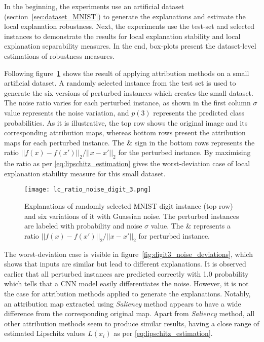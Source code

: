 \documentclass[english]{tktltiki2}
\theoremstyle{definition}
\theoremstyle{remark}
\begin{document}
In the beginning, the experiments use an artificial dataset (section~\ref{sec:dataset_MNIST}) to generate the explanations and estimate the local explanation robustness.  Next, the experiments use the test-set and selected instances to demonstrate the results for local explanation stability and local explanation separability measures. In the end, box-plots present the dataset-level estimations of robustness measures.

Following figure~\ref{fig:digit3_noise_ratio} shows the result of applying attribution methods on a small artificial dataset. A randomly selected instance from the test set is used to generate the six versions of perturbed instances which creates the small dataset. The noise ratio varies for each perturbed instance, as shown in the first column $\sigma$ value represents the noise variation, and $p(3)$ represents the predicted class probabilities. As it is illustrative, the top row shows the original image and its corresponding attribution maps, whereas bottom rows present the attribution maps for each perturbed instance. The \& sign in the bottom rows represents the ratio $||f(x) - f(x\prime)||_2/||x - x\prime||_2$ for the perturbed instance. By maximising the ratio as per \eqref{eq:lipschitz_estimation} gives the worst-deviation case of local explanation stability measure for this small dataset.

\begin{figure}[H]
	\vspace*{0mm}
	\centering
	\texttt{[image: lc\_ratio\_noise\_digit\_3.png]}
	\caption{Explanations of randomly selected MNIST digit instance (top row) and six variations of it with Guassian noise. The perturbed instances are labeled with probability and noise $\sigma$ value. The \& represents a ratio $||f(x) - f(x\prime)||_2/||x - x\prime||_2$ for perturbed instance.}%
	\label{fig:digit3_noise_ratio}%
\end{figure}

The worst-deviation case is visible in figure~\ref{fig:digit3_noise_deviations}, which shows that inputs are similar but lead to different explanations. It is observed earlier that all perturbed instances are predicted correctly with 1.0 probability which tells that a CNN model easily differentiates the noise. However, it is not the case for attribution methods applied to generate the explanations. Notably, an attribution map extracted using \textit{Saliency} method appears to have a wide difference from the corresponding original map. Apart from \textit{Saliency} method, all other attribution methods seem to produce similar results, having a close range of estimated Lipschitz values $L(x_i)$ as per \eqref{eq:lipschitz_estimation}.
\end{document}

